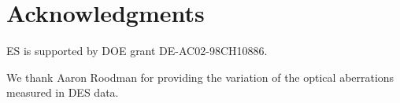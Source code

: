 \documentclass[usegraphicx,usenatbib]{mn2e}
\newcommand{\mcalR}{$R$}
\newcommand{\mcalRo}{$R_o$}
\newcommand{\mcalRnoise}{$R_\eta$}
\begin{document}

\section*{Acknowledgments}

ES is supported by DOE grant DE-AC02-98CH10886.

We thank Aaron Roodman for providing the variation of the optical aberrations
measured in DES data.



\end{document}
